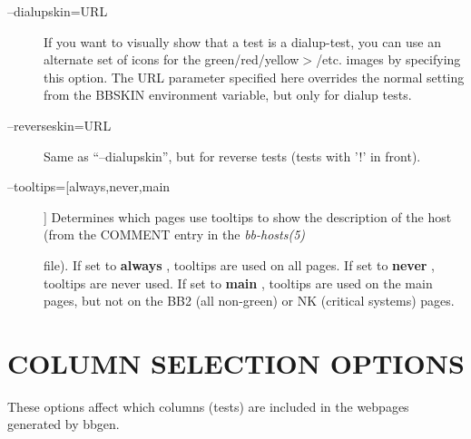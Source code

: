 \begin{description}
 

\item[--dialupskin=URL] If you want to visually show that a test is a
  dialup-test, you can use an alternate set of icons for the
  green/red/yellow$>$/etc. images by specifying this option. The URL
  parameter specified here overrides the normal setting from the
  BBSKIN environment variable, but only for dialup tests. 


 

\item[--reverseskin=URL] Same as ``--dialupskin'', but for reverse tests (tests with '!' in front). 

 

\item[--tooltips=[always,never,main]] Determines which pages use
  tooltips to show the description of the host (from the COMMENT entry
  in the \emph{bb-hosts(5)}

 file). If set to \textbf{always}
, tooltips are used on all pages. If set to \textbf{never}
, tooltips are never used. If set to \textbf{main}
, tooltips are used on the main pages, but not on the BB2 (all non-green) or NK (critical systems) pages. 

 


\end{description}

\section{COLUMN SELECTION OPTIONS}
 These options affect which columns (tests) are included in the webpages generated by bbgen. 

